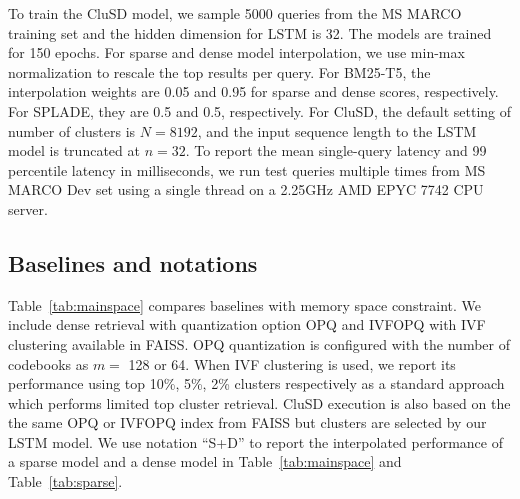 To train the CluSD model, we sample 5000 queries from the MS MARCO training set 
and the hidden dimension for LSTM is 32. The models are trained for 150 epochs. 
For sparse and dense model interpolation, we use min-max normalization to rescale the top results per query. 
For  BM25-T5, the interpolation  weights are  0.05 and 0.95 for sparse  and  dense scores, respectively. 
For SPLADE, they are  0.5 and  0.5, respectively. 
For CluSD, the default setting of number of clusters is $N=8192$, and the input sequence length to the LSTM model is truncated at $n=32$.  
To report the mean single-query latency and 99 percentile latency in milliseconds,
we  run test queries multiple times  from MS MARCO Dev set using a single thread on  a 2.25GHz AMD EPYC 7742  CPU server. 

\subsection{Baselines and notations}

Table~\ref{tab:mainspace} compares  baselines  with memory space constraint. 
We include dense retrieval with quantization option OPQ and  IVFOPQ with IVF clustering available in FAISS.
OPQ quantization  is configured with  the number of codebooks as $m=$ 128 or 64.  
When IVF clustering is used,  we report its performance  using top 10\%, 5\%, 2\% clusters respectively
as a standard approach which performs   limited top cluster retrieval. 
CluSD execution is also based on the the same OPQ or  IVFOPQ index from  FAISS but clusters are  selected  by our LSTM model. 
We use notation ``S+D'' to report the interpolated performance of a sparse model and a dense model in Table~\ref{tab:mainspace} and Table~\ref{tab:sparse}.

